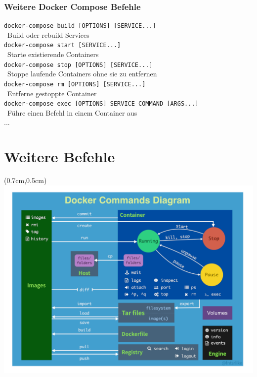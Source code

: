 \documentclass[22pt]{beamer}
\newcommand{\code}[1]{\colorbox{gray!15}{\texttt{#1}}}
\begin{document}
\begin{frame}[fragile]
    \frametitle{Weitere Docker Compose Befehle}
    \code{docker-compose build [OPTIONS] [SERVICE...]}\\
    \-  \ Build oder rebuild Services \\

    \code{docker-compose start [SERVICE...]}\\
    \-  \ Starte existierende Containers \\

    \code{docker-compose stop [OPTIONS] [SERVICE...]}\\
    \-  \ Stoppe laufende Containers ohne sie zu entfernen \\

    \code{docker-compose rm [OPTIONS] [SERVICE...]}\\
    \-  \ Entferne gestoppte Container \\

    \code{docker-compose exec [OPTIONS] SERVICE COMMAND [ARGS...]}\\
    \-  \ Führe einen Befehl in einem Container aus \\

    ...
\end{frame}

\section{Weitere Befehle}
\begin{frame}[t]
    \begin{textblock*}{\paperwidth}(0.7cm,0.5cm) %
        \includegraphics[width=0.9\paperwidth]{Bilder/Commands.png}
    \end{textblock*}
\end{frame} 
\end{document}
